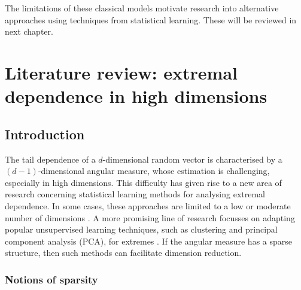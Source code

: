 \documentclass[en-GB, a4paper, nobind]{templates/bathreport}
\begin{document}
The limitations of these classical models motivate research into alternative approaches using techniques from statistical learning. These will be reviewed in next chapter.

\hypertarget{survey}{%
\chapter{Literature review: extremal dependence in high dimensions}\label{survey}}

\minitoc

\noindent 

\hypertarget{introduction-2}{%
\section{Introduction}\label{introduction-2}}

The tail dependence of a \(d\)-dimensional random vector is characterised by a \((d-1)\)-dimensional angular measure, whose estimation is challenging, especially in high dimensions. This difficulty has given rise to a new area of research concerning statistical learning methods for analysing extremal dependence. In some cases, these approaches are limited to a low or moderate number of dimensions \autocite{goixSparseRepresentationMultivariate2017,simpsonDeterminingDependenceStructure2019,meyerSparseRegularVariation2021}. A more promising line of research focusses on adapting popular unsupervised learning techniques, such as clustering and principal component analysis (PCA), for extremes \autocite{bernardClusteringMaximaSpatial2013,chautruDimensionReductionMultivariate2015,cooleyDecompositionsDependenceHighdimensional2019,dreesPrincipalComponentAnalysis2021,fomichovDetectionGroupsConcomitant2020,janssenKmeansClusteringExtremes2020,rohrbeckSimulatingFloodEvent2021}. If the angular measure has a sparse structure, then such methods can facilitate dimension reduction.

\hypertarget{notions-of-sparsity}{%
\subsection{Notions of sparsity}\label{notions-of-sparsity}}
\end{document}
